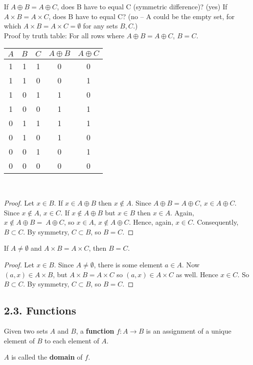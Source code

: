 \documentclass{article}
\theoremstyle{definition}
\begin{document}
If $A \oplus B = A \oplus C$, does B have to equal C (symmetric difference)? (yes)
If $A \times B = A \times C$, does B have to equal C? (no -- A could be the 
empty set, for which $A \times B = A \times C = \emptyset$ for any sets $B,C$.)\\

Proof by truth table: For all rows where $A \oplus B = A \oplus C$, $B=C$.

\begin{tabular}{ c|c|c|c|c }
  $A$ & $B$ & $C$ & $A \oplus B$ & $A \oplus C$\\
  \hline
  1 & 1 & 1 & 0 & 0\\
  1 & 1 & 0 & 0 & 1\\
  1 & 0 & 1 & 1 & 0\\
  1 & 0 & 0 & 1 & 1\\
  \hline
  0 & 1 & 1 & 1 & 1\\
  0 & 1 & 0 & 1 & 0\\
  0 & 0 & 1 & 0 & 1\\
  0 & 0 & 0 & 0 & 0
\end{tabular}\\

\begin{proof}
  Let $x \in B$. If $x \in A \oplus B$ then $x \notin A$. Since $A \oplus B =
  A \oplus C$, $x \in A \oplus C$. Since $x \notin A$, $x \in C$. If $x \notin
  A \oplus B$ but $x \in B$ then $x \in A$. Again, $x \notin A \oplus B =\
  A \oplus C$, so $x \in A$, $x \notin A \oplus C$. Hence, again, $x \in C$.
  Consequently, $B \subset C$. By symmetry, $C \subset B$, so $B=C$.
\end{proof}

If $A \neq \emptyset$ and $A \times B = A \times C$, then $B=C$.
\begin{proof}
  Let $x \in B$. Since $A \neq \emptyset$, there is some element $a \in A$.
  Now $(a,x) \in A \times B$, but $A \times B = A \times C$ so
  $(a,x) \in A \times C$ as well. Hence $x \in C$. So $B \subset C$.
  By symmetry, $C \subset B$, so $B = C$.
\end{proof}

\subsection*{2.3. Functions}

Given two sets $A$ and $B$, a \textbf{function} $f: A \to B$ is an assignment
of a unique element of $B$ to each element of $A$.

$A$ is called the \textbf{domain} of $f$.
\end{document}
